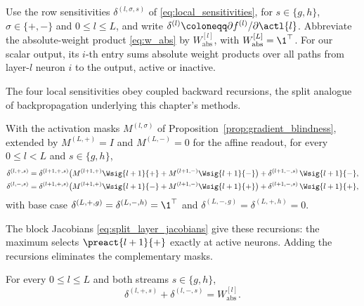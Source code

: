 \begin{definition}\label{def:local_sensitivities}
Use the row sensitivities $\delta^{(l,\sigma,s)}$ of \eqref{eq:local_sensitivities}, for $s\in\{g,h\}$, $\sigma\in\{+,-\}$ and $0\le l\le L$, and write $\delta^{(l)}\coloneqq\partial f^{(l)}/\partial\actl{l}$. Abbreviate the absolute-weight product \eqref{eq:w_abs} by $W_{\mathrm{abs}}^{[l]}$, with $W_{\mathrm{abs}}^{[L]}=\1^\top$. For our scalar output, its $i$-th entry sums absolute weight products over all paths from layer-$l$ neuron $i$ to the output, active or inactive.
\end{definition}

The four local sensitivities obey coupled backward recursions, the split analogue of backpropagation underlying this chapter's methods.

\begin{lemmaenv}\label{lem:split_backward_recursion}
With the activation masks $M^{(l,\sigma)}$ of Proposition~\ref{prop:gradient_blindness}, extended by $M^{(L,+)}=I$ and $M^{(L,-)}=0$ for the affine readout, for every $0 \leq l < L$ and $s \in \{g, h\}$,
\begin{align}
	\delta^{(l, +, s)}
	&= \delta^{(l+1, +, s)} \bigl( M^{(l+1, +)} \Wsig{l+1}{+} + M^{(l+1, -)} \Wsig{l+1}{-} \bigr)
	+ \delta^{(l+1, -, s)} \, \Wsig{l+1}{-},
	\label{eq:delta_plus_recursion} \\
	\delta^{(l, -, s)}
	&= \delta^{(l+1, +, s)} \bigl( M^{(l+1, +)} \Wsig{l+1}{-} + M^{(l+1, -)} \Wsig{l+1}{+} \bigr)
	+ \delta^{(l+1, -, s)} \, \Wsig{l+1}{+},
	\label{eq:delta_minus_recursion}
\end{align}
with base case $\delta^{(L, +, g)} = \delta^{(L, -, h)} = \1^{\top}$ and $\delta^{(L, -, g)} = \delta^{(L, +, h)} = 0$.\end{lemmaenv}

The block Jacobians \eqref{eq:split_layer_jacobians} give these recursions: the maximum selects $\preact{l+1}{+}$ exactly at active neurons. Adding the recursions eliminates the complementary masks.

\begin{proposition}\label{prop:sensitivity_mass}
For every $0 \leq l \leq L$ and both streams $s \in \{g, h\}$,
\begin{equation}
	\delta^{(l, +, s)} + \delta^{(l, -, s)} = W_{\mathrm{abs}}^{[l]}.
	\label{eq:mass_conservation}
\end{equation}\end{proposition}

